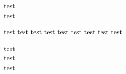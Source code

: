 \documentclass[logo,
									cna,
									date = 01.09.2020,
									classe = 6G]{exam}
\begin{document}
	
	\begin{quest}
		test\\
		test
	\end{quest}

\begin{quest}
	\begin{questionEnum}
		\task[\oneStar{4}] test  
		\task[\twoStar{4}] test  
		\task[\threeStar{4}] test  
		\task[\oneStar{4}] test  
		\task[\twoStar{4}] test  
		\task[\threeStar{4}] test
		\task[\oneStar{4}] test
		\task[\twoStar{4}] test
		\task[\threeStar{4}] test
	\end{questionEnum}
\end{quest}

\begin{quest}
	test\\
	test\\
	test
\end{quest}
\end{document}
